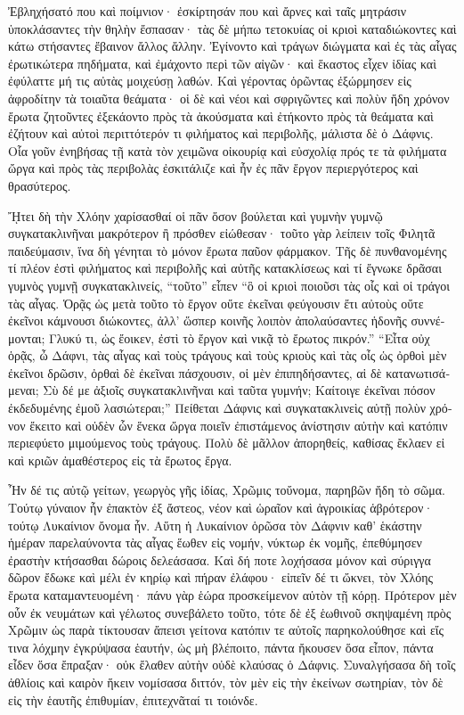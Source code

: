 \documentclass{book}
\begin{document}
\begin{pairs}
\begin{Leftside}
\begin{greek}
  Ἐβληχήσατό που καὶ ποίμνιον· ἐσκίρτησάν που καὶ ἄρνες καὶ ταῖς μητράσιν ὑποκλάσαντες τὴν θηλὴν ἔσπασαν· τὰς δὲ μήπω τετοκυίας οἱ κριοὶ καταδιώκοντες καὶ κάτω στήσαντες ἔβαινον ἄλλος ἄλλην.  Ἐγίνοντο καὶ τράγων διώγματα καὶ ἐς τὰς αἶγας ἐρωτικώτερα πηδήματα, καὶ ἐμάχοντο περὶ τῶν αἰγῶν· καὶ ἕκαστος εἶχεν ἰδίας καὶ ἐφύλαττε μή τις αὐτὰς μοιχεύσῃ λαθών.  Καὶ γέροντας ὁρῶντας ἐξώρμησεν εἰς ἀφροδίτην τὰ τοιαῦτα θεάματα· οἱ δὲ καὶ νέοι καὶ σφριγῶντες καὶ πολὺν ἤδη χρόνον ἔρωτα ζητοῦντες ἐξεκάοντο πρὸς τὰ ἀκούσματα καὶ ἐτήκοντο πρὸς τὰ θεάματα καὶ ἐζήτουν καὶ αὐτοὶ περιττότερόν τι φιλήματος καὶ περιβολῆς, μάλιστα δὲ ὁ Δάφνις.  Οἷα γοῦν ἐνηβήσας τῇ κατὰ τὸν χειμῶνα οἰκουρίᾳ καὶ εὐσχολίᾳ πρός τε τὰ φιλήματα ὤργα καὶ πρὸς τὰς περιβολὰς ἐσκιτάλιζε καὶ ἦν ἐς πᾶν ἔργον περιεργότερος καὶ θρασύτερος.
\pend


  ᾜτει δὴ τὴν Χλόην χαρίσασθαί οἱ πᾶν ὅσον βούλεται καὶ γυμνὴν γυμνῷ συγκατακλινῆναι μακρότερον ἢ πρόσθεν εἰώθεσαν· τοῦτο γὰρ λείπειν τοῖς Φιλητᾶ παιδεύμασιν, ἵνα δὴ γένηται τὸ μόνον ἔρωτα παῦον φάρμακον.  Τῆς δὲ πυνθανομένης τί πλέον ἐστὶ φιλήματος καὶ περιβολῆς καὶ αὐτῆς κατακλίσεως καὶ τί ἔγνωκε δρᾶσαι γυμνὸς γυμνῇ συγκατακλινείς, “τοῦτο” εἶπεν “ὃ οἱ κριοὶ ποιοῦσι τὰς οἶς καὶ οἱ τράγοι τὰς αἶγας.  Ὁρᾷς ὡς μετὰ τοῦτο τὸ ἔργον οὔτε ἐκεῖναι φεύγουσιν ἔτι αὐτοὺς οὔτε ἐκεῖνοι κάμνουσι διώκοντες, ἀλλ’ ὥσπερ κοινῆς λοιπὸν ἀπολαύσαντες ἡδονῆς συννέμονται; Γλυκύ τι, ὡς ἔοικεν, ἐστὶ τὸ ἔργον καὶ νικᾷ τὸ ἔρωτος πικρόν.” “Εἶτα οὐχ ὁρᾷς,  ὦ Δάφνι, τὰς αἶγας καὶ τοὺς τράγους καὶ τοὺς κριοὺς καὶ τὰς οἶς ὡς ὀρθοὶ μὲν ἐκεῖνοι δρῶσιν, ὀρθαὶ δὲ ἐκεῖναι πάσχουσιν, οἱ μὲν ἐπιπηδήσαντες, αἱ δὲ κατανωτισάμεναι; Σὺ δέ με ἀξιοῖς συγκατακλινῆναι καὶ ταῦτα γυμνήν; Καίτοιγε ἐκεῖναι πόσον ἐκδεδυμένης ἐμοῦ  λασιώτεραι;” Πείθεται Δάφνις καὶ συγκατακλινεὶς αὐτῇ πολὺν χρόνον ἔκειτο καὶ οὐδὲν ὧν ἕνεκα ὤργα ποιεῖν ἐπιστάμενος ἀνίστησιν αὐτὴν καὶ κατόπιν περιεφύετο μιμούμενος τοὺς τράγους. Πολὺ δὲ μᾶλλον ἀπορηθείς, καθίσας ἔκλαεν εἰ καὶ κριῶν ἀμαθέστερος εἰς τὰ ἔρωτος ἔργα.
\pend


  Ἦν δέ τις αὐτῷ γείτων, γεωργὸς γῆς ἰδίας, Χρῶμις τοὔνομα, παρηβῶν ἤδη τὸ σῶμα. Τούτῳ γύναιον ἦν ἐπακτὸν ἐξ ἄστεος, νέον καὶ ὡραῖον καὶ ἀγροικίας ἁβρότερον·  τούτῳ Λυκαίνιον ὄνομα ἦν. Αὕτη ἡ Λυκαίνιον ὁρῶσα τὸν Δάφνιν καθ’ ἑκάστην ἡμέραν παρελαύνοντα τὰς αἶγας ἕωθεν εἰς νομήν, νύκτωρ ἐκ νομῆς, ἐπεθύμησεν ἐραστὴν κτήσασθαι δώροις δελεάσασα.  Καὶ δή ποτε λοχήσασα μόνον καὶ σύριγγα δῶρον ἔδωκε καὶ μέλι ἐν κηρίῳ καὶ πήραν ἐλάφου· εἰπεῖν δέ τι ὤκνει, τὸν Χλόης ἔρωτα καταμαντευομένη·  πάνυ γὰρ ἑώρα προσκείμενον αὐτὸν τῇ κόρῃ. Πρότερον μὲν οὖν ἐκ νευμάτων καὶ γέλωτος συνεβάλετο τοῦτο, τότε δὲ ἐξ ἑωθινοῦ σκηψαμένη πρὸς Χρῶμιν ὡς παρὰ τίκτουσαν ἄπεισι γείτονα κατόπιν τε αὐτοῖς παρηκολούθησε καὶ εἴς τινα λόχμην ἐγκρύψασα ἑαυτήν, ὡς μὴ βλέποιτο, πάντα ἤκουσεν ὅσα εἶπον, πάντα εἶδεν ὅσα ἔπραξαν· οὐκ ἔλαθεν αὐτὴν οὐδὲ κλαύσας ὁ Δάφνις.  Συναλγήσασα δὴ τοῖς ἀθλίοις καὶ καιρὸν ἥκειν νομίσασα διττόν, τὸν μὲν εἰς τὴν ἐκείνων σωτηρίαν, τὸν δὲ εἰς τὴν ἑαυτῆς ἐπιθυμίαν, ἐπιτεχνᾶταί τι τοιόνδε.
\pend



\end{greek}
\end{Leftside}
\end{pairs}
\end{document}
